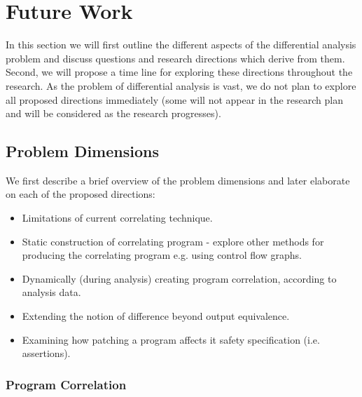 \section{Future Work}

In this section we will first outline the different aspects of the differential analysis problem and discuss questions and research directions which derive from them. Second, we will propose a time line for exploring these directions throughout the research. As the problem of differential analysis is vast, we do not plan to explore all proposed directions immediately (some will not appear in the research plan and will be considered as the research progresses).

\subsection{Problem Dimensions}

We first describe a brief overview of the problem dimensions and later elaborate on each of the proposed directions:

\begin{itemize}
\item Limitations of current correlating technique.
\item Static construction of correlating program - explore other methods for producing the correlating program e.g. using control flow graphs.
\item Dynamically (during analysis) creating program correlation, according to analysis data.
\end{itemize}

\begin{itemize}
\item Extending the notion of difference beyond output equivalence.
\item Examining how patching a program affects it safety specification (i.e. assertions).
\end{itemize}




\subsubsection{Program Correlation}

